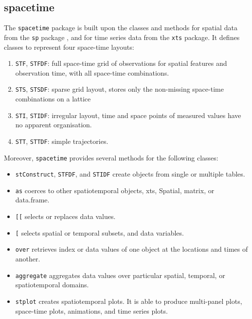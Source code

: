 \documentclass[smallroyalvopaper]{memoir}
\begin{document}
\subsection{spacetime}
\label{sec:orgheadline38}
\label{sec:spacetime}

The \texttt{spacetime} package \cite{Pebesma2012} is built upon the classes and methods for spatial data from the \texttt{sp} package , and for time series data from the \texttt{xts} package. It defines classes to represent four space-time layouts:

\begin{enumerate}
\item \texttt{STF}, \texttt{STFDF}: full space-time grid of observations for spatial features and observation time, with all space-time combinations.

\item \texttt{STS}, \texttt{STSDF}: sparse grid layout, stores only the non-missing space-time combinations on a lattice

\item \texttt{STI}, \texttt{STIDF}: irregular layout, time and space points of measured values have no apparent organisation.

\item \texttt{STT}, \texttt{STTDF}: simple trajectories.
\end{enumerate}

Moreover, \texttt{spacetime} provides several methods for the following classes:

\begin{itemize}
\item \texttt{stConstruct}, \texttt{STFDF}, and \texttt{STIDF} create objects from single or multiple tables.

\item \texttt{as} coerces to other spatiotemporal objects, xts, Spatial, matrix, or data.frame.

\item \texttt{[[} selects or replaces data values.

\item \texttt{[} selects spatial or temporal subsets, and data variables.

\item \texttt{over} retrieves index or data values of one object at the locations and times of another.

\item \texttt{aggregate} aggregates data values over particular spatial, temporal, or spatiotemporal domains.

\item \texttt{stplot} creates spatiotemporal plots. It is able to produce multi-panel plots, space-time plots, animations, and time series plots.
\end{itemize}
\end{document}
